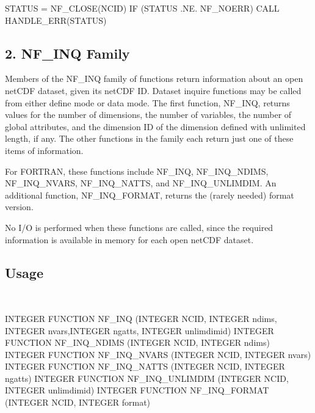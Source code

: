 S\+T\+A\+T\+US = N\+F\+\_\+\+C\+L\+O\+S\+E(\+N\+C\+I\+D) IF (S\+T\+A\+T\+US .NE. N\+F\+\_\+\+N\+O\+E\+RR) C\+A\+LL H\+A\+N\+D\+L\+E\+\_\+\+E\+R\+R(\+S\+T\+A\+T\+U\+S)\hypertarget{nc_f77_interface_guide_f77_NF-INQ-Family}{}\subsection{2. N\+F\+\_\+\+I\+N\+Q Family }\label{nc_f77_interface_guide_f77_NF-INQ-Family}
Members of the N\+F\+\_\+\+I\+NQ family of functions return information about an open net\+C\+DF dataset, given its net\+C\+DF ID. Dataset inquire functions may be called from either define mode or data mode. The first function, N\+F\+\_\+\+I\+NQ, returns values for the number of dimensions, the number of variables, the number of global attributes, and the dimension ID of the dimension defined with unlimited length, if any. The other functions in the family each return just one of these items of information.

For F\+O\+R\+T\+R\+AN, these functions include N\+F\+\_\+\+I\+NQ, N\+F\+\_\+\+I\+N\+Q\+\_\+\+N\+D\+I\+MS, N\+F\+\_\+\+I\+N\+Q\+\_\+\+N\+V\+A\+RS, N\+F\+\_\+\+I\+N\+Q\+\_\+\+N\+A\+T\+TS, and N\+F\+\_\+\+I\+N\+Q\+\_\+\+U\+N\+L\+I\+M\+D\+IM. An additional function, N\+F\+\_\+\+I\+N\+Q\+\_\+\+F\+O\+R\+M\+AT, returns the (rarely needed) format version.

No I/O is performed when these functions are called, since the required information is available in memory for each open net\+C\+DF dataset.

\subsection*{Usage }

 

I\+N\+T\+E\+G\+ER F\+U\+N\+C\+T\+I\+ON N\+F\+\_\+\+I\+NQ (I\+N\+T\+E\+G\+ER N\+C\+ID, I\+N\+T\+E\+G\+ER ndims, I\+N\+T\+E\+G\+ER nvars,I\+N\+T\+E\+G\+ER ngatts, I\+N\+T\+E\+G\+ER unlimdimid) I\+N\+T\+E\+G\+ER F\+U\+N\+C\+T\+I\+ON N\+F\+\_\+\+I\+N\+Q\+\_\+\+N\+D\+I\+MS (I\+N\+T\+E\+G\+ER N\+C\+ID, I\+N\+T\+E\+G\+ER ndims) I\+N\+T\+E\+G\+ER F\+U\+N\+C\+T\+I\+ON N\+F\+\_\+\+I\+N\+Q\+\_\+\+N\+V\+A\+RS (I\+N\+T\+E\+G\+ER N\+C\+ID, I\+N\+T\+E\+G\+ER nvars) I\+N\+T\+E\+G\+ER F\+U\+N\+C\+T\+I\+ON N\+F\+\_\+\+I\+N\+Q\+\_\+\+N\+A\+T\+TS (I\+N\+T\+E\+G\+ER N\+C\+ID, I\+N\+T\+E\+G\+ER ngatts) I\+N\+T\+E\+G\+ER F\+U\+N\+C\+T\+I\+ON N\+F\+\_\+\+I\+N\+Q\+\_\+\+U\+N\+L\+I\+M\+D\+IM (I\+N\+T\+E\+G\+ER N\+C\+ID, I\+N\+T\+E\+G\+ER unlimdimid) I\+N\+T\+E\+G\+ER F\+U\+N\+C\+T\+I\+ON N\+F\+\_\+\+I\+N\+Q\+\_\+\+F\+O\+R\+M\+AT (I\+N\+T\+E\+G\+ER N\+C\+ID, I\+N\+T\+E\+G\+ER format)

